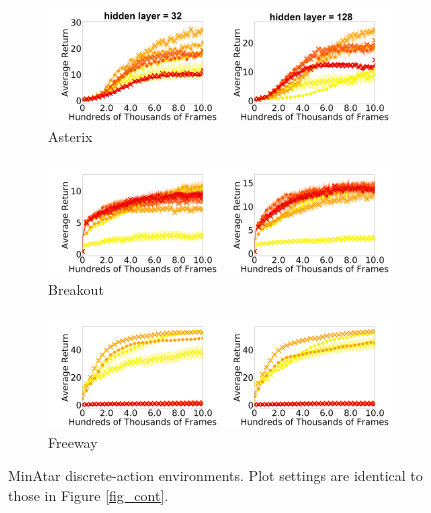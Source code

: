 \documentclass[twoside,11pt]{article}
\begin{document}
\begin{figure}[!htb]
  \centering
  \begin{subfigure}[b]{1\linewidth}
    \centering
    \includegraphics[width=\columnwidth]{figs/deep/discrete/asterix_combined.png} 
    \caption{Asterix
    }\label{fig:asterix}
  \end{subfigure}%
  
  \begin{subfigure}[b]{1\linewidth}
    \centering
    \includegraphics[width=\columnwidth]{figs/deep/discrete/breakout_combined.png} 
    \caption{Breakout
    }\label{fig:breakout}
  \end{subfigure}%
  
  \begin{subfigure}[b]{1\linewidth}
    \centering
    \includegraphics[width=\columnwidth]{figs/deep/discrete/freeway_combined.png} 
    \caption{Freeway
    }\label{fig:freeway}
  \end{subfigure}%
  \caption{MinAtar discrete-action environments. Plot settings are identical to those in Figure \ref{fig_cont}. }\label{fig:minatar}
\end{figure}
\end{document}
